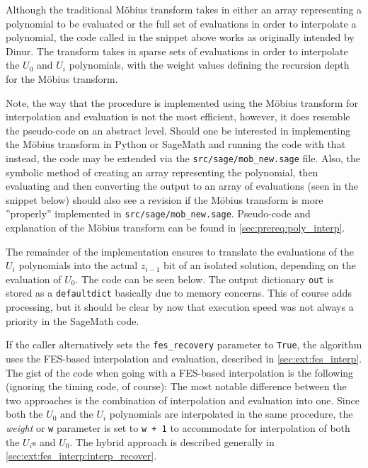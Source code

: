 Although the traditional Möbius transform takes in either an array representing a polynomial to be evaluated or the full set of evaluations in order to interpolate a polynomial, the code called in the snippet above works as originally intended by Dinur. The transform takes in sparse sets of evaluations in order to interpolate the $U_0$ and $U_i$ polynomials, with the weight values defining the recursion depth for the Möbius transform.

Note, the way that the procedure is implemented using the Möbius transform for interpolation and evaluation is not the most efficient, however, it does resemble the pseudo-code on an abstract level. Should one be interested in implementing the Möbius transform in Python or SageMath and running the code with that instead, the code may be extended via the \texttt{src/sage/mob\_new.sage} file. Also, the symbolic method of creating an array representing the polynomial, then evaluating and then converting the output to an array of evaluations (seen in the snippet below)
should also see a revision if the Möbius transform is more ''properly'' implemented in \texttt{src/sage/mob\_new.sage}. Pseudo-code and explanation of the Möbius transform can be found in \cref{sec:prereq:poly_interp}.

The remainder of the implementation ensures to translate the evaluations of the $U_i$ polynomials into the actual $z_{i - 1}$ bit of an isolated solution, depending on the evaluation of $U_0$. The code can be seen below.
The output dictionary \texttt{out} is stored as a \texttt{defaultdict} basically due to memory concerns. This of course adds processing, but it should be clear by now that execution speed was not always a priority in the SageMath code.

If the caller alternatively sets the \texttt{fes\_recovery} parameter to \texttt{True}, the algorithm uses the FES-based interpolation and evaluation, described in \cref{sec:ext:fes_interp}. The gist of the code when going with a FES-based interpolation is the following (ignoring the timing code, of course):
The most notable difference between the two approaches is the combination of interpolation and evaluation into one. Since both the $U_0$ and the $U_i$ polynomials are interpolated in the same procedure, the \textit{weight} or \texttt{w} parameter is set to \texttt{w + 1} to accommodate for interpolation of both the $U_i$s and $U_0$. The hybrid approach is described generally in \cref{sec:ext:fes_interp:interp_recover}.

